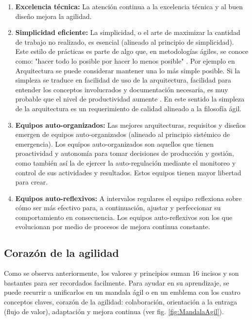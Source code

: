 \begin{enumerate}
\item \textbf{Excelencia técnica:} La atención continua a la excelencia técnica y al buen diseño mejora la agilidad.

\item \textbf{Simplicidad eficiente:} La simplicidad, o el arte de maximizar la cantidad de trabajo no realizado, es esencial (alineado al principio de simplicidad). Este estilo de prácticas es parte de algo que, en metodologías ágiles, se conoce como: "hacer todo lo posible por hacer lo menos posible" \cite{Anacleto-2005}. Por ejemplo en Arquitectura se puede considerar mantener una lo más simple posible. Si la simpleza se traduce en facilidad de uso de la arquitectura, facilidad para entender los conceptos involucrados y documentación necesaria, es muy probable que el nivel de productividad aumente \cite{Anacleto-2005}. En este sentido la simpleza de la arquitectura es un requerimiento de calidad alineado a la filosofía ágil.

\item \textbf{Equipos auto-organizados:} Las mejores arquitecturas, requisitos y diseños emergen de equipos auto-organizados (alineado al principio sistémico de emergencia). Los equipos auto-organizados son aquellos que tienen proactividad y autonomía para tomar decisiones de producción y gestión, como también así la de ejercer la auto-regulación mediante el monitoreo y control de sus actividades y resultados. Estos equipos tienen mayor libertad para crear.

\item \textbf{Equipos auto-reflexivos:} A intervalos regulares el equipo reflexiona sobre cómo ser más efectivo para, a continuación, ajustar y perfeccionar su comportamiento en consecuencia. Los equipos auto-reflexivos son los que evolucionan por medio de procesos de mejora continua constante.

\end{enumerate}

\subsection{Corazón de la agilidad}

Como se observa anteriormente, los valores y principios suman 16 incisos y son bastantes para ser recordados facilmente. Para ayudar en su aprendizaje, se puede recurrir a unificarlos en un mandala ágil o en un emblema con los cuatro conceptos claves, corazón de la agilidad: colaboración, orientación a la entraga (flujo de valor), adaptación y mejora continua (ver fig. \ref{fig:MandalaAgil}).

